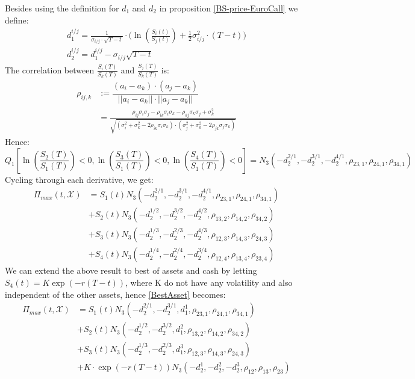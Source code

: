 Besides using the definition for $d_1$ and $d_2$ in proposition \ref{BS-price-EuroCall} we define:
\begin{align*}
d^{i/j}_1 =\frac{1}{\sigma_{i/j}\cdot \sqrt{T-t}} \cdot \bigg( \ln(\frac{S_i(t)}{S_j(t)}) + \frac{1}{2} \sigma_{i/j}^2 \cdot (T-t) \bigg)\\
d^{i/j}_2=d^{i/j}_1-\sigma_{i/j} \sqrt{T-t}
\end{align*}
The correlation between $\frac{S_i(T)}{S_k(T)}$ and $\frac{S_j(T)}{S_k(T)}$ is:
\begin{align*}
\rho_{ij,k}&:= \dfrac{(a_i-a_k)\cdot(a_j-a_k)}{||a_i-a_k|| \cdot ||a_j-a_k||}\\
&=\frac{\rho_{ij}\sigma_i \sigma_j - \rho_{ik}\sigma_i \sigma_k - \rho_{kj}\sigma_k \sigma_j + \sigma_k^2}{\sqrt{(\sigma_i^2 + \sigma_k^2 - 2\rho_{ik}\sigma_i \sigma_k)\cdot(\sigma_j^2 + \sigma_k^2 - 2\rho_{jk}\sigma_j \sigma_k)}}
\end{align*}
Hence:
$$Q_1[\ln(\frac{S_2(T)}{S_1(T)})<0, \ln(\frac{S_3(T)}{S_1(T)})<0, \ln(\frac{S_4(T)}{S_1(T)})<0]=N_3(-d_2^{2/1},-d_2^{3/1},-d_2^{4/1}, \rho_{23,1}, \rho_{24,1}, \rho_{34,1})$$
Cycling through each derivative, we get:
\begin{equation}\label{BestAsset}
\begin{split}
\Pi_{max}(t,\mathcal{X})&=S_1(t) N_3(-d_2^{2/1},-d_2^{3/1},-d_2^{4/1}, \rho_{23,1}, \rho_{24,1}, \rho_{34,1}) \\
&+S_2(t) N_3(-d_2^{1/2},-d_2^{3/2},-d_2^{4/2}, \rho_{13,2}, \rho_{14,2}, \rho_{34,2})\\
&+S_3(t) N_3(-d_2^{1/3},-d_2^{2/3},-d_2^{4/3}, \rho_{12,3}, \rho_{14,3}, \rho_{24,3}) \\
&+S_4(t) N_3(-d_2^{1/4},-d_2^{2/4},-d_2^{3/4}, \rho_{12,4}, \rho_{13,4}, \rho_{23,4})
\end{split}
\end{equation}
We can extend the above result to best of assets and cash by letting $S_4(t)=K\exp(-r(T-t))$, where K do not have any volatility and also independent of the other assets, hence \eqref{BestAsset} becomes:
\begin{equation}\label{BestAssetOrCash}
\begin{split}
\Pi_{max}(t,\mathcal{X})&=S_1(t) N_3(-d_2^{2/1},-d_2^{3/1},d_1^{1}, \rho_{23,1}, \rho_{24,1}, \rho_{34,1}) \\
&+S_2(t) N_3(-d_2^{1/2},-d_2^{3/2},d_1^{2}, \rho_{13,2}, \rho_{14,2}, \rho_{34,2})\\
&+S_3(t) N_3(-d_2^{1/3},-d_2^{2/3},d_1^{3}, \rho_{12,3}, \rho_{14,3}, \rho_{24,3}) \\
&+K\cdot \exp(-r(T-t)) N_3(-d_2^1,-d_2^2,-d_2^3, \rho_{12}, \rho_{13}, \rho_{23})
\end{split}
\end{equation}

